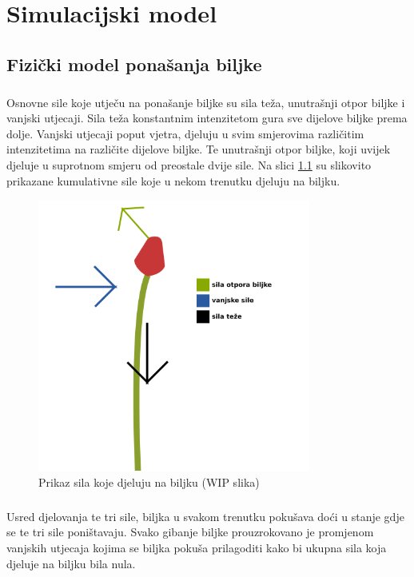 \documentclass[times, utf8, diplomski]{fer}
\begin{document}
\chapter{Simulacijski model}
\section{Fizički model ponašanja biljke}
\paragraph{}
Osnovne sile koje utječu na ponašanje biljke su sila teža, unutrašnji otpor 
biljke i vanjski utjecaji. Sila teža konstantnim intenzitetom gura sve dijelove 
biljke prema dolje. Vanjski utjecaji poput vjetra, djeluju u svim smjerovima 
različitim intenzitetima na različite dijelove biljke. Te unutrašnji otpor 
biljke, koji uvijek djeluje u suprotnom smjeru od preostale dvije sile. Na 
slici \ref{fig:31-1} su slikovito prikazane kumulativne sile koje u nekom 
trenutku djeluju na biljku.

\begin{figure}[h]
	\centering
	\includegraphics[width=0.8\textwidth]{img/31-1}
	\caption{Prikaz sila koje djeluju na biljku (WIP slika)}
	\label{fig:31-1}
\end{figure}

\paragraph{}
Usred djelovanja te tri sile, biljka u svakom trenutku pokušava doći u stanje gdje se te tri 
sile poništavaju. Svako gibanje biljke prouzrokovano je promjenom vanjskih utjecaja kojima 
se biljka pokuša prilagoditi kako bi ukupna sila koja djeluje na biljku bila nula.
\end{document}
